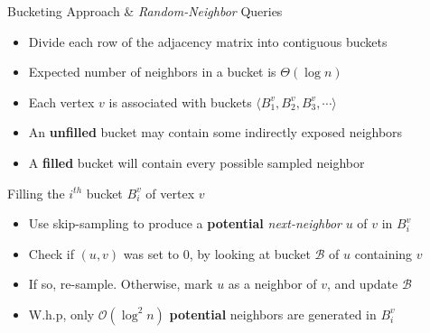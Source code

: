 \begin{block}{Bucketing Approach \& \emph{Random-Neighbor} Queries}

\begin{itemize}
    \item Divide each row of the adjacency matrix into contiguous buckets
    \item Expected number of neighbors in a bucket is $\Theta(\log n)$
    \item Each vertex $v$ is associated with buckets $ \langle B^v_1, B^v_2, B^v_3,\cdots\rangle$
    \item An \textbf{unfilled} bucket may contain some indirectly exposed neighbors
    \item A \textbf{filled} bucket will contain every possible sampled neighbor
\end{itemize}


\begin{alertblock}{Filling the $i^{th}$ bucket $B^v_i$ of vertex $v$}
\begin{itemize}
    \item Use skip-sampling to produce a \textbf{potential} \emph{next-neighbor} $u$ of $v$ in $B^v_i$
    \item Check if $(u, v)$ was set to $0$, by looking at bucket $\mathcal B$ of $u$ containing $v$
    \item If so, re-sample. Otherwise, mark $u$ as a neighbor of $v$, and update $\mathcal B$
    \item W.h.p, only $\mathcal O(\log^2 n)$ \textbf{potential} neighbors are generated in $B^v_i$
\end{itemize}
\end{alertblock}

\end{block}



\vspace{-0.2in}


